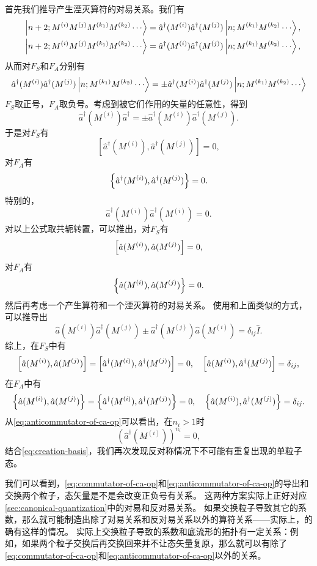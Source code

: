\documentclass[UTF8, a4paper]{ctexart}
\begin{document}
首先我们推导产生湮灭算符的对易关系。我们有
\[
    \begin{split}
        \ket{n+2;M^{(i)}M^{(j)}M^{(k_1)}M^{(k_2)} \cdots} = \hat{a}^\dagger (M^{(i)}) \hat{a}^\dagger (M^{(j)}) \ket{n; M^{(k_1)}M^{(k_2)} \cdots}, \\ 
        \quad \ket{n+2;M^{(i)}M^{(j)}M^{(k_1)}M^{(k_2)} \cdots} = \hat{a}^\dagger (M^{(i)}) \hat{a}^\dagger (M^{(j)}) \ket{n; M^{(k_1)}M^{(k_2)} \cdots},
    \end{split}
\]
从而对$F_S$和$F_A$分别有
\[
    \hat{a}^\dagger (M^{(i)}) \hat{a}^\dagger (M^{(j)}) \ket{n; M^{(k_1)}M^{(k_2)} \cdots} = \pm \hat{a}^\dagger (M^{(i)}) \hat{a}^\dagger (M^{(j)}) \ket{n; M^{(k_1)}M^{(k_2)} \cdots}
\]
$F_S$取正号，$F_A$取负号。考虑到被它们作用的矢量的任意性，得到
\[
    \hat{a}^\dagger (M^{(i)}) \hat{a}^\dagger = \pm \hat{a}^\dagger (M^{(i)}) \hat{a}^\dagger (M^{(j)}).
\]
于是对$F_S$有
\[
    [\hat{a}^\dagger (M^{(i)}), \hat{a}^\dagger (M^{(j)})] = 0,
\]
对$F_A$有
\[
    \acomm{\hat{a}^\dagger (M^{(i)})}{\hat{a}^\dagger (M^{(j)})} = 0.
\]
特别的，
\[
    \hat{a}^\dagger (M^{(i)}) \hat{a}^\dagger (M^{(i)}) = 0.
\]
对以上公式取共轭转置，可以推出，对$F_S$有
\[
    \comm{\hat{a}(M^{(i)})}{\hat{a}(M^{(j)})} = 0,
\]
对$F_A$有
\[
    \acomm{\hat{a}(M^{(i)})}{\hat{a}(M^{(j)})} = 0.
\]
然后再考虑一个产生算符和一个湮灭算符的对易关系。
使用和上面类似的方式，可以推导出
\[
    \hat{a}(M^{(i)}) \hat{a}^\dagger (M^{(j)}) \pm \hat{a}^\dagger (M^{(j)}) \hat{a} (M^{(i)}) = \delta_{ij} \hat{I}.
\]
综上，在$F_S$中有
\begin{equation}
    \comm{\hat{a}(M^{(i)})}{\hat{a}(M^{(j)})} = \comm{\hat{a}^\dagger(M^{(i)})}{\hat{a}^\dagger(M^{(j)})} = 0, \quad \comm{\hat{a} (M^{(i)})}{\hat{a}^\dagger (M^{(j)})} = \delta_{ij},
    \label{eq:commutator-of-ca-op}
\end{equation}
在$F_A$中有
\begin{equation}
    \acomm{\hat{a}(M^{(i)})}{\hat{a}(M^{(j)})} = \acomm{\hat{a}^\dagger(M^{(i)})}{\hat{a}^\dagger(M^{(j)})} = 0, \quad \acomm{\hat{a} (M^{(i)})}{\hat{a}^\dagger (M^{(j)})} = \delta_{ij}.
    \label{eq:anticommutator-of-ca-op}
\end{equation}
从\eqref{eq:anticommutator-of-ca-op}可以看出，在$n_i > 1$时
\[
    \left( \hat{a}^\dagger (M^{(i)}) \right)^{n_i} = 0,
\]
结合\eqref{eq:creation-basis}，我们再次发现反对称情况下不可能有重复出现的单粒子态。

我们可以看到，\eqref{eq:commutator-of-ca-op}和\eqref{eq:anticommutator-of-ca-op}的导出和交换两个粒子，态矢量是不是会改变正负号有关系。
这两种方案实际上正好对应\autoref{sec:canonical-quantization}中的对易和反对易关系。
如果交换粒子导致其它的系数，那么就可能制造出除了对易关系和反对易关系以外的算符关系——实际上，的确有这样的情况。
实际上交换粒子导致的系数和底流形的拓扑有一定关系：例如，如果两个粒子交换后再交换回来并不让态矢量复原，那么就可以有除了\eqref{eq:commutator-of-ca-op}和\eqref{eq:anticommutator-of-ca-op}以外的关系。
\end{document}
